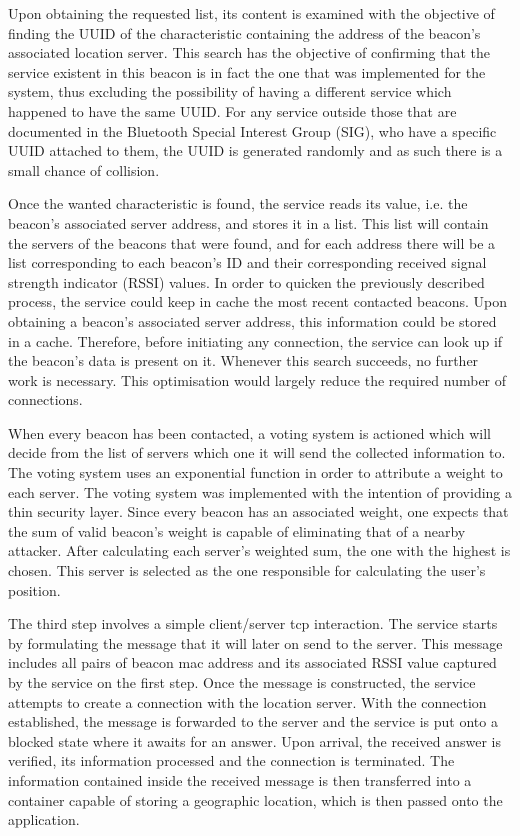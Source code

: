  
Upon obtaining the requested list, its content is examined with the objective of finding the UUID of the characteristic containing the address of the beacon's associated location server. This search has the objective of confirming that the service existent in this beacon is in fact the one that was implemented for the system, thus excluding the possibility of having a different service which happened to have the same UUID. For any service outside those that are documented in the Bluetooth Special Interest Group (SIG), who have a specific UUID attached to them, the UUID is generated randomly and as such there is a small chance of collision.  
 
 
Once the wanted characteristic is found, the service reads its value, i.e. the beacon's associated server address, and stores it in a list. This list will contain the servers of the beacons that were found, and for each address there will be a list corresponding to each beacon's ID and their corresponding received signal strength indicator (RSSI) values. In order to quicken the previously described process, the service could keep in cache the most recent contacted beacons. Upon obtaining a beacon's associated server address, this information could be stored in a cache. Therefore, before initiating any connection, the service can look up if the beacon's data is present on it. Whenever this search succeeds, no further work is necessary. This optimisation would largely reduce the required number of connections. 
 
 
When every beacon has been contacted, a voting system is actioned which will decide from the list of servers which one it will send the collected information to. The voting system uses an exponential function in order to attribute a weight to each server.  
The voting system was implemented with the intention of providing a thin security layer. Since every beacon has an associated weight, one expects that the sum of valid beacon's weight is capable of eliminating that of a nearby attacker. After calculating each server's weighted sum, the one with the highest is chosen. This server is selected as the one responsible for calculating the user's position.  
 
 
The third step involves a simple client/server tcp interaction. The service starts by formulating the message that it will later on send to the server. This message includes all pairs of beacon mac address and its associated RSSI value captured by the service on the first step. Once the message is constructed, the service attempts to create a connection with the location server. With the connection established, the message is forwarded to the server and the service is put onto a blocked state where it awaits for an answer. Upon arrival, the received answer is verified, its information processed and the connection is terminated. The information contained inside the received message is then transferred into a container capable of storing a geographic location, which is then passed onto the application. 
 
 
 